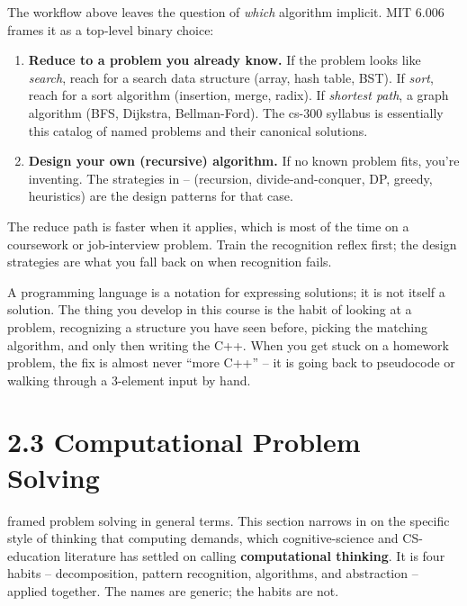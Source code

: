 \documentclass[11pt]{article}
\begin{document}
\begin{notebox}
The workflow above leaves the question of \emph{which} algorithm
implicit. MIT 6.006 frames it as a top-level binary choice:

\begin{enumerate}[leftmargin=*,noitemsep]
    \item \textbf{Reduce to a problem you already know.} If the
          problem looks like \emph{search}, reach for a search data
          structure (array, hash table, BST). If \emph{sort}, reach
          for a sort algorithm (insertion, merge, radix). If
          \emph{shortest path}, a graph algorithm (BFS, Dijkstra,
          Bellman-Ford). The cs-300 syllabus is essentially this
          catalog of named problems and their canonical solutions.
    \item \textbf{Design your own (recursive) algorithm.} If no
          known problem fits, you're inventing. The strategies in
          -- (recursion,
          divide-and-conquer, DP, greedy, heuristics) are the
          design patterns for that case.
\end{enumerate}

The reduce path is faster when it applies, which is most of the
time on a coursework or job-interview problem. Train the
recognition reflex first; the design strategies are what you fall
back on when recognition fails.
\end{notebox}

\begin{ideabox}
A programming language is a notation for expressing solutions; it is
not itself a solution. The thing you develop in this course is the
habit of looking at a problem, recognizing a structure you have seen
before, picking the matching algorithm, and only then writing the
C++. When you get stuck on a homework problem, the fix is almost
never ``more C++'' -- it is going back to pseudocode or walking
through a 3-element input by hand.
\end{ideabox}

\section{2.3 Computational Problem Solving}

 framed problem solving in general terms. This section
narrows in on the specific style of thinking that computing demands,
which cognitive-science and CS-education literature has settled on
calling \textbf{computational thinking}. It is four habits --
decomposition, pattern recognition, algorithms, and abstraction --
applied together. The names are generic; the habits are not.
\end{document}
